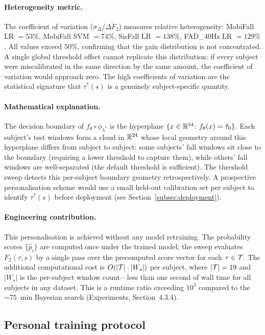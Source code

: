 \paragraph{Heterogeneity metric.}
The coefficient of variation ($\sigma_\Delta / \overline{\Delta F_2}$) measures
relative heterogeneity: MobiFall LR $=53\%$, MobiFall SVM $=74\%$, SisFall
LR $=138\%$, FAD\_40Hz LR $=129\%$.  All values exceed $50\%$, confirming that
the gain distribution is not concentrated.  A single global threshold offset
cannot replicate this distribution: if every subject were miscalibrated in the
same direction by the same amount, the coefficient of variation would approach
zero.  The high coefficients of variation are the statistical signature that
$\tau^*(s)$ is a genuinely subject-specific quantity.

\paragraph{Mathematical explanation.}
The decision boundary of $f_\theta\circ\phi_{\lambda^*}$ is the hyperplane
$\{x\in\mathbb{R}^{24}\colon f_\theta(x)=\hat\tau_0\}$.  Each subject's test windows form
a cloud in $\mathbb{R}^{24}$ whose local geometry around this hyperplane differs from subject
to subject: some subjects' fall windows sit close to the boundary (requiring a lower
threshold to capture them), while others' fall windows are well-separated (the default
threshold is sufficient).  The threshold sweep detects this per-subject boundary
geometry retrospectively.  A prospective personalisation scheme would use a small
held-out calibration set per subject to identify $\tau^*(s)$ before deployment
(see Section~\ref{subsec:deployment}).

\paragraph{Engineering contribution.}
This personalisation is achieved without any model retraining.  The probability
scores $\{\hat p_i\}$ are computed once under the trained model; the sweep evaluates
$F_2(\tau, s)$ by a single pass over the precomputed score vector for each $\tau
\in\mathcal{T}$.  The additional computational cost is $O(|\mathcal{T}|\cdot|W_s|)$ per subject,
where $|\mathcal{T}|=19$ and $|W_s|$ is the per-subject window count---less than one second
of wall time for all subjects in any dataset.  This is a runtime ratio exceeding
$10^3$ compared to the ${\sim}75$~min Bayesian search (Experiments,
Section~4.3.4).

\subsection{Personal training protocol}
\label{subsubsec:personal-protocol}

